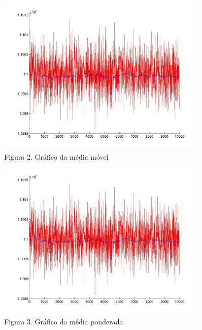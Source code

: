 \documentclass[12pt, a4paper, twoside]{article}
\begin{document}
\begin{figure}
  \includegraphics[width=0.9\textwidth]{mediamovel.jpg}
  \caption{Figura 2. Gráfico da média móvel}
\end{figure}

\begin{figure}
  \includegraphics[width=0.9\textwidth]{mediamovel.jpg}
  \caption{Figura 3. Gráfico da média ponderada}
\end{figure}
\end{document}

